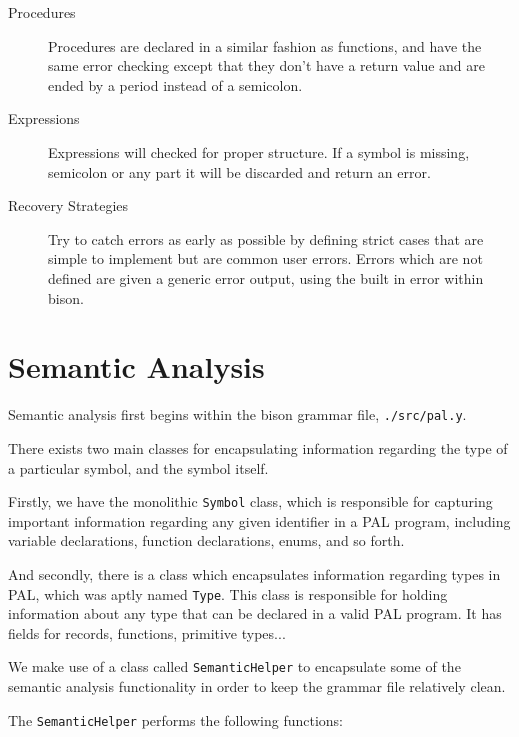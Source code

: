 \documentclass{article}
\begin{document}
\begin{description}
\item[Procedures]
	Procedures are declared in a similar fashion as functions, and have the same
	error checking except that they don't have a return value and are ended by 
	a period instead of a semicolon. 

\item[Expressions]
	Expressions will checked for proper structure. If a symbol is missing,
	semicolon or any part it will be discarded and return an error. 
	
\item[Recovery Strategies]
	Try to catch errors as early as possible by defining strict cases that are
	simple to implement but are common user errors. Errors which are not defined
	are given a generic error output, using the built in error within bison.

\end{description}

\section*{Semantic Analysis}
Semantic analysis first begins within the bison grammar file, \texttt{./src/pal.y}. 

There exists two main classes for encapsulating information regarding the type of a particular symbol,
and the symbol itself.

Firstly, we have the monolithic \texttt{Symbol} class, which is responsible for capturing important information regarding any
given identifier in a PAL program, including variable declarations, function declarations, enums,
and so forth.

And secondly, there is a class which encapsulates information regarding types in PAL, which was aptly named \texttt{Type}.
This class is responsible for holding information about any type that can be declared in a valid PAL program. It has fields 
for records, functions, primitive types...

We make use of a class called \texttt{SemanticHelper} to encapsulate some of the semantic analysis 
functionality in order to keep the grammar file relatively clean.

The \texttt{SemanticHelper} performs the following functions:
\end{document}

